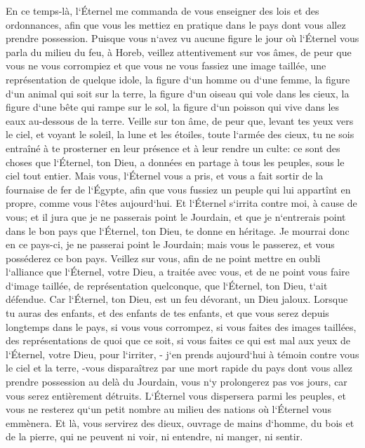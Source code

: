 \verse En ce temps-là, l`Éternel me commanda de vous enseigner des lois et des ordonnances, afin que vous les mettiez en pratique dans le pays dont vous allez prendre possession. 
\verse Puisque vous n`avez vu aucune figure le jour où l`Éternel vous parla du milieu du feu, à Horeb, veillez attentivement sur vos âmes, 
\verse de peur que vous ne vous corrompiez et que vous ne vous fassiez une image taillée, une représentation de quelque idole, la figure d`un homme ou d`une femme, 
\verse la figure d`un animal qui soit sur la terre, la figure d`un oiseau qui vole dans les cieux, 
\verse la figure d`une bête qui rampe sur le sol, la figure d`un poisson qui vive dans les eaux au-dessous de la terre. 
\verse Veille sur ton âme, de peur que, levant tes yeux vers le ciel, et voyant le soleil, la lune et les étoiles, toute l`armée des cieux, tu ne sois entraîné à te prosterner en leur présence et à leur rendre un culte: ce sont des choses que l`Éternel, ton Dieu, a données en partage à tous les peuples, sous le ciel tout entier. 
\verse Mais vous, l`Éternel vous a pris, et vous a fait sortir de la fournaise de fer de l`Égypte, afin que vous fussiez un peuple qui lui appartînt en propre, comme vous l`êtes aujourd`hui. 
\verse Et l`Éternel s`irrita contre moi, à cause de vous; et il jura que je ne passerais point le Jourdain, et que je n`entrerais point dans le bon pays que l`Éternel, ton Dieu, te donne en héritage. 
\verse Je mourrai donc en ce pays-ci, je ne passerai point le Jourdain; mais vous le passerez, et vous posséderez ce bon pays. 
\verse Veillez sur vous, afin de ne point mettre en oubli l`alliance que l`Éternel, votre Dieu, a traitée avec vous, et de ne point vous faire d`image taillée, de représentation quelconque, que l`Éternel, ton Dieu, t`ait défendue. 
\verse Car l`Éternel, ton Dieu, est un feu dévorant, un Dieu jaloux. 
\verse Lorsque tu auras des enfants, et des enfants de tes enfants, et que vous serez depuis longtemps dans le pays, si vous vous corrompez, si vous faites des images taillées, des représentations de quoi que ce soit, si vous faites ce qui est mal aux yeux de l`Éternel, votre Dieu, pour l`irriter, - 
\verse j`en prends aujourd`hui à témoin contre vous le ciel et la terre, -vous disparaîtrez par une mort rapide du pays dont vous allez prendre possession au delà du Jourdain, vous n`y prolongerez pas vos jours, car vous serez entièrement détruits. 
\verse L`Éternel vous dispersera parmi les peuples, et vous ne resterez qu`un petit nombre au milieu des nations où l`Éternel vous emmènera. 
\verse Et là, vous servirez des dieux, ouvrage de mains d`homme, du bois et de la pierre, qui ne peuvent ni voir, ni entendre, ni manger, ni sentir. 
